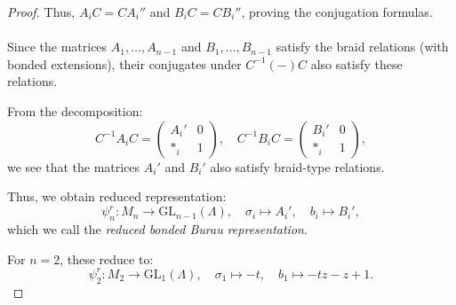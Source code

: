 \documentclass[10pt,a4paper]{amsart}
\begin{document}
\begin{proof}
Thus, $A_i C = C A_i''$ and $B_i C = C B_i''$, proving the conjugation formulas.\\
\\
Since the matrices $A_1, \dots, A_{n-1}$ and $B_1, \dots, B_{n-1}$ satisfy the braid relations (with bonded extensions), their conjugates under $C^{-1} (-) C$ also satisfy these relations.

From the decomposition:
$$
C^{-1} A_i C = \begin{pmatrix} A_i' & 0 \\ \ast_i & 1 \end{pmatrix}, \quad
C^{-1} B_i C = \begin{pmatrix} B_i' & 0 \\ \ast_i & 1 \end{pmatrix},
$$
we see that the matrices $A_i'$ and $B_i'$ also satisfy braid-type relations.

Thus, we obtain reduced representation:
$$
\psi_n^r: M_n \longrightarrow \mathrm{GL}_{n-1}(\Lambda), \quad \sigma_i \mapsto A_i', \quad b_i \mapsto B_i',
$$
which we call the \emph{reduced bonded Burau representation}.

For $n = 2$, these reduce to:
$$
\psi_2^r : M_2 \longrightarrow \mathrm{GL}_1(\Lambda), \quad \sigma_1 \mapsto -t, \quad b_1 \mapsto -tz - z + 1.
$$


\end{proof}
\end{document}
